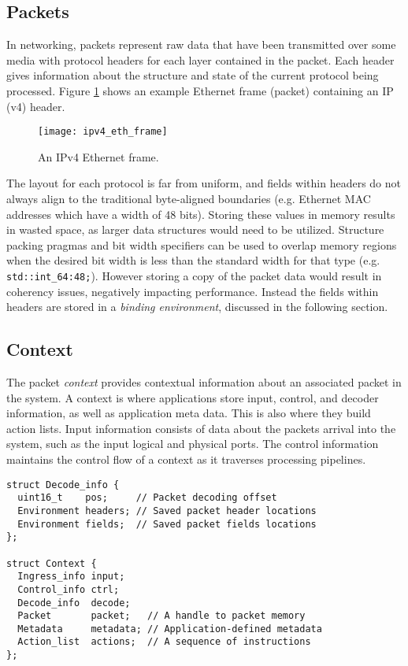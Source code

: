 \subsection{Packets}
In networking, packets represent raw data that have been transmitted over some
media with protocol headers for each layer contained in the packet. Each header
gives information about the structure and state of the current protocol being
processed. Figure \ref{ipv4_eth_frame} shows an example Ethernet frame
(packet) containing an IP (v4) header.

\begin{figure}[h]
\centering
\texttt{[image: ipv4\_eth\_frame]}
\caption{An IPv4 Ethernet frame.}
\label{ipv4_eth_frame}
\end{figure}

The layout for each protocol is far from uniform, and fields within headers do
not always align to the traditional byte-aligned boundaries (e.g. Ethernet
MAC addresses which have a width of 48 bits). Storing these values in memory
results in wasted space, as larger data structures would need to be utilized.
Structure packing pragmas and bit width specifiers can be used to overlap
memory regions when the desired bit width is less than the standard width for
that type (e.g. \texttt{std::int\_64:48;}). However storing a copy of the
packet data would result in coherency issues, negatively impacting
performance. Instead the fields within headers are stored in a \emph{binding
environment}, discussed in the following section.

\subsection{Context}
The packet \emph{context} provides contextual information about an associated
packet in the system. A context is where applications store input, control, and
decoder information, as well as application meta data. This is also where they
build action lists.
Input information consists of data about the packets arrival into the system,
such as the input logical and physical ports. The control information maintains
the control flow of a context as it traverses processing pipelines.

\begin{lstlisting}
struct Decode_info {
  uint16_t    pos;     // Packet decoding offset
  Environment headers; // Saved packet header locations
  Environment fields;  // Saved packet fields locations
};

struct Context {
  Ingress_info input;
  Control_info ctrl;
  Decode_info  decode;
  Packet       packet;   // A handle to packet memory
  Metadata     metadata; // Application-defined metadata
  Action_list  actions;  // A sequence of instructions
};
\end{lstlisting}

